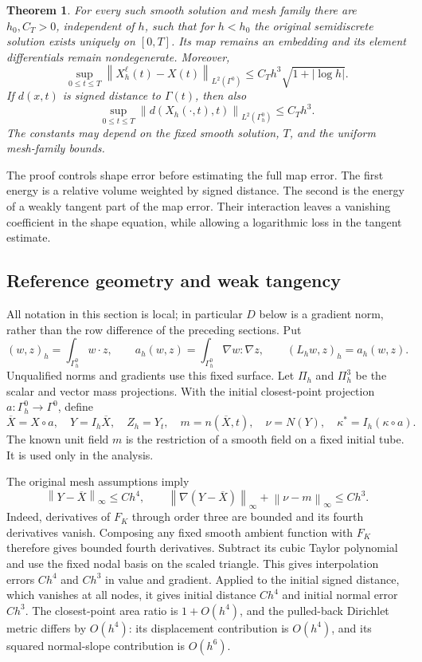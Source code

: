 \documentclass[11pt,a4paper]{article}
\numberwithin{equation}{section}
\newtheorem{theorem}{Theorem}[section]
\theoremstyle{remark}
\newcommand{\norm}[1]{\left\lVert #1\right\rVert}
\begin{document}
\begin{theorem}\label{thm:cubic}
For every such smooth solution and mesh family there are \(h_0,C_T>0\),
independent of \(h\), such that for \(h<h_0\) the original semidiscrete
solution exists uniquely on \([0,T]\). Its map remains an embedding and
its element differentials remain nondegenerate. Moreover,
\begin{equation}\label{eq:cubic-result}
 \sup_{0\leq t\leq T}
 \norm{X_h^\ell(t)-X(t)}_{L^2(\Gamma^0)}
       \leq C_T h^3\sqrt{1+|\log h|}.
\end{equation}
If \(d(x,t)\) is signed distance to \(\Gamma(t)\), then also
\[
 \sup_{0\leq t\leq T}\norm{d(X_h(\cdot,t),t)}_{L^2(\Gamma_h^0)}
       \leq C_T h^3 .
\]
The constants may depend on the fixed smooth solution, \(T\), and the
uniform mesh-family bounds.
\end{theorem}

The proof controls shape error before estimating the full map error.
The first energy is a relative volume weighted by signed distance.
The second is the energy of a weakly tangent part of the map error.
Their interaction leaves a vanishing coefficient in the shape equation,
while allowing a logarithmic loss in the tangent estimate.

\subsection{Reference geometry and weak tangency}

All notation in this section is local; in particular \(D\) below is a
gradient norm, rather than the row difference of the preceding sections.
Put
\[
 (w,z)_h=\int_{\Gamma_h^0}w\cdot z,\qquad
 a_h(w,z)=\int_{\Gamma_h^0}\nabla w:\nabla z,
 \qquad (L_hw,z)_h=a_h(w,z).
\]
Unqualified norms and gradients use this fixed surface. Let \(\Pi_h\)
and \(\Pi_h^3\) be the scalar and vector mass projections. With the
initial closest-point projection \(a:\Gamma_h^0\to\Gamma^0\), define
\[
 \overline X=X\circ a,\quad Y=I_h\overline X,\quad Z_h=Y_t,
 \quad m=n(\overline X,t),\quad\nu=N(Y),\quad
 \kappa^*=I_h(\kappa\circ a).
\]
The known unit field \(m\) is the restriction of a smooth field on a
fixed initial tube. It is used only in the analysis.

The original mesh assumptions imply
\begin{equation}\label{eq:cubic-interpolation}
 \norm{Y-\overline X}_\infty\leq Ch^4,\qquad
 \norm{\nabla(Y-\overline X)}_\infty
       +\norm{\nu-m}_\infty\leq Ch^3.
\end{equation}
Indeed, derivatives of \(F_K\) through order three are bounded and
its fourth derivatives vanish. Composing any fixed smooth ambient
function with \(F_K\) therefore gives bounded fourth derivatives.
Subtract its cubic Taylor polynomial and use the fixed nodal basis
on the scaled triangle. This gives interpolation errors \(Ch^4\)
and \(Ch^3\) in value and gradient. Applied to the initial signed
distance, which vanishes at all nodes, it gives initial distance
\(Ch^4\) and initial normal error \(Ch^3\).
The closest-point area ratio is \(1+O(h^4)\), and the pulled-back
Dirichlet metric differs by \(O(h^4)\): its displacement contribution
is \(O(h^4)\), and its squared normal-slope contribution is \(O(h^6)\).
\end{document}
